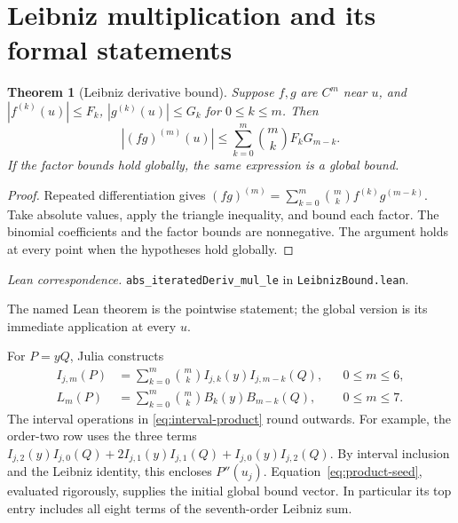 \documentclass[11pt]{article}
\newtheorem{theorem}{Theorem}[section]
\theoremstyle{definition}
\theoremstyle{remark}
\newcommand{\code}[1]{\nolinkurl{#1}}
\newcommand{\leanref}[2]{\par\smallskip\noindent\textit{Lean correspondence.}
  \code{#1} in \code{#2}.\par\smallskip}
\numberwithin{equation}{section}
\begin{document}
\section{Leibniz multiplication and its formal statements}
\label{sec:product}

\begin{theorem}[Leibniz derivative bound]
\label{thm:leibniz}
Suppose $f,g$ are $C^m$ near $u$, and
$|f^{(k)}(u)|\leq F_k$, $|g^{(k)}(u)|\leq G_k$ for $0\leq k\leq m$.
Then
\begin{equation}
 |(fg)^{(m)}(u)|\leq\sum_{k=0}^{m}\binom{m}{k}F_kG_{m-k}.
 \label{eq:leibniz-bound}
\end{equation}
If the factor bounds hold globally, the same expression is a global bound.
\end{theorem}
\begin{proof}
Repeated differentiation gives
$(fg)^{(m)}=\sum_{k=0}^{m}\binom{m}{k}f^{(k)}g^{(m-k)}$.
Take absolute values, apply the triangle inequality, and bound each factor.
The binomial coefficients and the factor bounds are nonnegative. The
argument holds at every point when the hypotheses hold globally.
\end{proof}
\leanref{abs_iteratedDeriv_mul_le}{LeibnizBound.lean}
The named Lean theorem is the pointwise statement; the global version is
its immediate application at every $u$.

For $P=yQ$, Julia constructs
\begin{align}
 I_{j,m}(P)&=\sum_{k=0}^{m}\binom{m}{k}
        I_{j,k}(y)I_{j,m-k}(Q), &&0\leq m\leq6,\label{eq:interval-product}\\
 L_m(P)&=\sum_{k=0}^{m}\binom{m}{k}B_k(y)B_{m-k}(Q),
        &&0\leq m\leq7.\label{eq:product-seed}
\end{align}
The interval operations in \eqref{eq:interval-product} round outwards.
For example, the order-two row uses the three terms
$I_{j,2}(y)I_{j,0}(Q)+2I_{j,1}(y)I_{j,1}(Q)+I_{j,0}(y)I_{j,2}(Q)$.
By interval inclusion and the Leibniz identity, this encloses $P''(u_j)$.
Equation~\eqref{eq:product-seed}, evaluated rigorously, supplies the initial
global bound vector. In particular its top entry includes all eight terms
of the seventh-order Leibniz sum.
\end{document}
